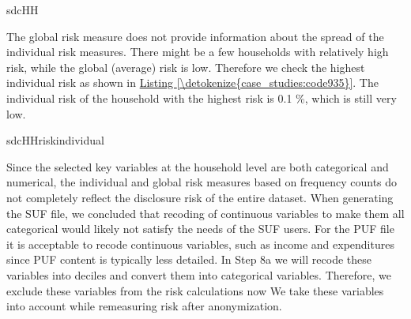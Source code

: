 \documentclass[letterpaper,10pt,english]{sphinxmanual}
\begin{document}
\def\sphinxLiteralBlockLabel{\label{\detokenize{case_studies:code934}}}
%
\begin{sphinxVerbatim}[commandchars=\\\{\},numbers=left,firstnumber=1,stepnumber=1]
sdcHH 
\end{sphinxVerbatim}

The global risk measure does not provide information about the spread of
the individual risk measures. There might be a few households with
relatively high risk, while the global (average) risk is low. Therefore
we check the highest individual risk as shown in \hyperref[\detokenize{case_studies:code935}]{Listing \ref{\detokenize{case_studies:code935}}}. The
individual risk of the household with the highest risk is 0.1 \%, which
is still very low.

\def\sphinxLiteralBlockLabel{\label{\detokenize{case_studies:code935}}}
%
\begin{sphinxVerbatim}[commandchars=\\\{\},numbers=left,firstnumber=1,stepnumber=1]
sdcHHriskindividual\PYG{p}{[} \PYG{p}{]}
\end{sphinxVerbatim}

Since the selected key variables at the household level are both
categorical and numerical, the individual and global risk measures based
on frequency counts do not completely reflect the disclosure risk of the
entire dataset. When generating the SUF file, we concluded that recoding
of continuous variables to make them all categorical would likely not
satisfy the needs of the SUF users. For the PUF file it is acceptable to
recode continuous variables, such as income and expenditures since PUF
content is typically less detailed. In Step 8a we will recode these
variables into deciles and convert them into categorical variables.
Therefore, we exclude these variables from the risk calculations now We
take these variables into account while remeasuring risk after
anonymization.
\end{document}
